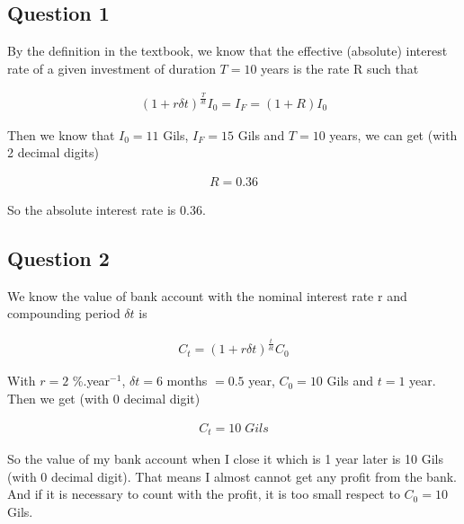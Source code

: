\documentclass{report}
\begin{document}
\begin{spacing}{1.3541667}

\begin{center}
\section*{Question 1}
\end{center}

\par By the definition in the textbook, we know that the effective (absolute) interest rate 
of a given investment of duration $T =10$ years is the rate R such that

\begin{align*}
    \boxed{{(1+r\delta t)}^{\frac{T}{\delta t}}I_0=I_F=(1+R)I_0}
\end{align*}

Then we know that $I_0=11$ Gils, $I_F=15$ Gils and $T=10$ years, we can get (with 2 decimal digits)

\begin{align*}
    \boxed{R=0.36}
\end{align*}

So the absolute interest rate is 0.36.

\newpage

\begin{center}
    \section*{Question 2}
\end{center}

\par We know the value of bank account with the nominal interest rate r and compounding period $\delta t$ is 

\begin{align*}
    \boxed{C_t={(1+r\delta t)}^{\frac{t}{\delta t}}C_0}
\end{align*}

With $r=2$ \%.year$^{-1}$, $\delta t=6$ months $=0.5$ year, $C_0=10$ Gils and $t=1$ year. Then we get (with 0 decimal digit)

\begin{align*}
    \boxed{C_t =10\;Gils}
\end{align*}

\par So the value of my bank account when I close it which is 1 year later is 10 Gils (with 0 decimal digit). 
That means I almost cannot get any profit from the bank. 
And if it is necessary to count with the profit, it is too small respect to $C_0=10$ Gils. 


\end{spacing}
\end{document}
